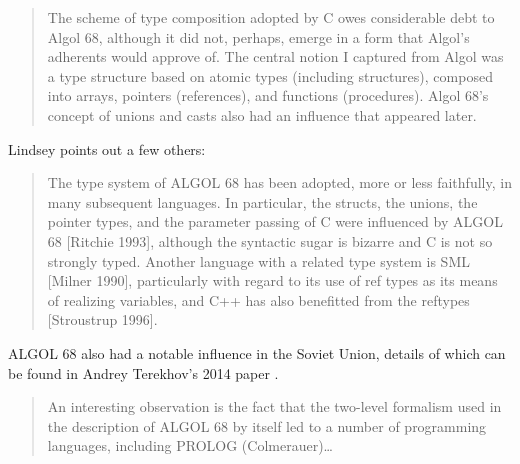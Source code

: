 \begin{quotation}
	The scheme of type composition adopted by C owes considerable debt to Algol 68,
	although it did not, perhaps, emerge in a form that Algol's adherents would
	approve of. The central notion I captured from Algol was a type structure based
	on atomic types (including structures), composed into arrays, pointers
	(references), and functions (procedures). Algol 68's concept of unions and
	casts also had an influence that appeared later.
	\cite{development_of_c_language_chist_ritchie_1996}
\end{quotation}

Lindsey points out a few others:

\begin{quotation}
	The type system of ALGOL 68 has been adopted, more or less faithfully, in many subsequent
	languages. In particular, the structs, the unions, the pointer types, and the parameter passing of C
	were influenced by ALGOL 68 [Ritchie 1993], although the syntactic sugar is bizarre and C is not so
	strongly typed. Another language with a related type system is SML [Milner 1990], particularly with
	regard to its use of ref types as its means of realizing variables, and C++ has also benefitted from the
	reftypes [Stroustrup 1996].
\end{quotation}

ALGOL 68 also had a notable influence in the Soviet Union, details of which can
be found in Andrey Terekhov's 2014 paper .


\begin{quotation}
	An interesting observation is the fact that the two-level formalism used
	in the description of ALGOL 68 by itself led to a number of programming
	languages, including PROLOG (Colmerauer)\dots
	\cite{a_shorter_history_of_algol68_1994}
\end{quotation}
